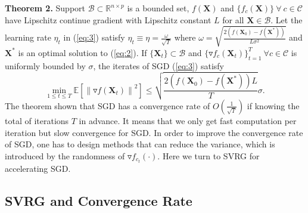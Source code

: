\documentclass[letterpaper]{article}
\begin{document}
		\textbf{Theorem 2.} Support $\mathcal{B}\subset\mathbb{R}^{n\times p}$ is a bounded set, $f(\mathbf{X})$ and $\{f_c(\mathbf{X})\}\ \forall\ c\in\mathcal{C}$ have Lipschitz continue gradient with Lipschitz constant $L$ for all $\mathbf{X}\in\mathcal{B}$. Let the learning rate $\eta_t$ in (\ref{eq:3}) satisfy $\eta_t\equiv\eta=\frac{\omega}{\sqrt{T}}$ where $\omega=\sqrt{\frac{2\left(f(\mathbf{X}_0)-f(\mathbf{X}^*)\right)}{L\sigma^2}}$ and $\mathbf{X}^*$ is an optimal solution to (\ref{eq:2}). If $\{\mathbf{X}_t\}\subset\mathcal{B}$ and $\{\triangledown f_c(\mathbf{X}_t)\}^T_{t=1}\ \forall c\in\mathcal{C}$ is uniformly bounded by $\sigma$, the iterates of SGD (\ref{eq:3}) satisfy
		$$
		\underset{1\leq t\leq T}{\min}\mathbb{E}\left[\left\|\triangledown f(\mathbf{X}_t)\right\|^2\right]\leq\sqrt{\frac{2(f(\mathbf{X}_0)-f(\mathbf{X}^*))L}{T}}\sigma.
		$$
		The theorem shown that SGD has a convergence rate of $O(\frac{1}{\sqrt{T}})$ if knowing the total of iterations $T$ in advance. It means that we only get fast computation per iteration but slow convergence for SGD. In order to improve the convergence rate of SGD, one has to design methods that can reduce the variance, which is introduced by the randomness of $\triangledown f_{c_t}(\cdot)$. Here we turn to SVRG for accelerating SGD.

		\subsection{SVRG and Convergence Rate}
\end{document}
